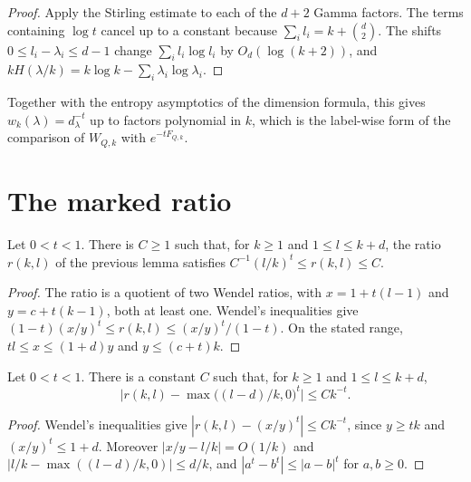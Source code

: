 \begin{proof}\leanok
    Apply the Stirling estimate to each of the $d+2$ Gamma factors. The terms
    containing $\log t$ cancel up to a constant because
    $\sum_il_i=k+\binom d2$. The shifts $0\le l_i-\lambda_i\le d-1$ change
    $\sum_il_i\log l_i$ by $O_d(\log(k+2))$, and
    $kH(\lambda/k)=k\log k-\sum_i\lambda_i\log\lambda_i$.
\end{proof}

Together with the entropy asymptotics of the dimension formula, this gives
$w_k(\lambda)=d_\lambda^{-t}$ up to factors polynomial in $k$, which is the
label-wise form of the comparison of $W_{Q,k}$ with $e^{-tF_{Q,k}}$.

\section{The marked ratio}

\begin{lemma}
    \label{lem:replica_ratio_bounds}
    \leanok
    Let $0<t<1$. There is $C\ge1$ such that, for $k\ge1$ and $1\le l\le k+d$,
    the ratio $r(k,l)$ of the previous lemma satisfies
    $C^{-1}(l/k)^t\le r(k,l)\le C$.
\end{lemma}

\begin{proof}\leanok
    The ratio is a quotient of two Wendel ratios, with $x=1+t(l-1)$ and
    $y=c+t(k-1)$, both at least one. Wendel's inequalities give
    $(1-t)(x/y)^t\le r(k,l)\le(x/y)^t/(1-t)$. On the stated range,
    $tl\le x\le(1+d)y$ and $y\le(c+t)k$.
\end{proof}

\begin{lemma}
    \label{lem:replica_ratio_limit}
    \leanok
    Let $0<t<1$. There is a constant $C$ such that, for $k\ge1$ and
    $1\le l\le k+d$,
    \[
        \bigl|r(k,l)-\max\bigl((l-d)/k,0\bigr)^t\bigr|\le Ck^{-t}.
    \]
\end{lemma}

\begin{proof}\leanok
    Wendel's inequalities give $|r(k,l)-(x/y)^t|\le Ck^{-t}$, since $y\ge tk$
    and $(x/y)^t\le1+d$. Moreover $|x/y-l/k|=O(1/k)$ and
    $|l/k-\max((l-d)/k,0)|\le d/k$, and $|a^t-b^t|\le|a-b|^t$ for $a,b\ge0$.
\end{proof}

